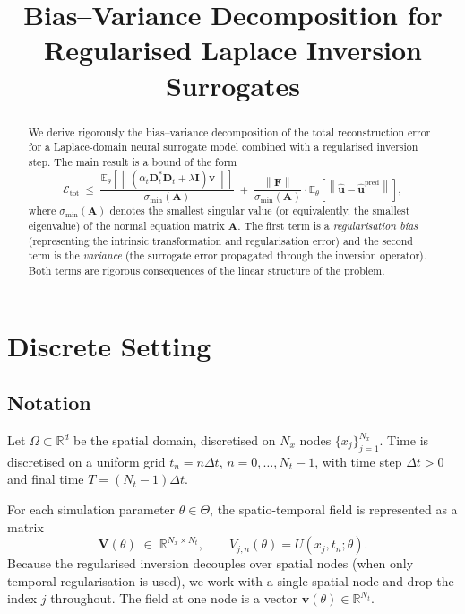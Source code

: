 \documentclass[11pt, a4paper]{article}
\title{%
  Bias--Variance Decomposition for\\
  Regularised Laplace Inversion Surrogates
}
\author{}
\date{}
\newcommand{\R}{\mathbb{R}}
\newcommand{\E}{\mathbb{E}}
\newcommand{\norm}[1]{\left\|#1\right\|}
\begin{document}
\maketitle

\begin{abstract}
We derive rigorously the bias--variance decomposition of the total reconstruction
error for a Laplace-domain neural surrogate model combined with a regularised
inversion step. The main result is a bound of the form
\[
  \mathcal{E}_{\mathrm{tot}}
  \;\leq\;
  \frac{\E_\theta\!\left[\norm{(\alpha_t \mathbf{D}_t^*\mathbf{D}_t + \lambda\mathbf{I})\mathbf{v}}\right]}
       {\sigma_{\min}(\mathbf{A})}
  \;+\;
  \frac{\norm{\mathbf{F}}}{\sigma_{\min}(\mathbf{A})}
  \cdot
  \E_\theta\!\left[\norm{\hat{\mathbf{u}} - \hat{\mathbf{u}}^{\mathrm{pred}}}\right],
\]
where $\sigma_{\min}(\mathbf{A})$ denotes the smallest singular value (or equivalently, the smallest eigenvalue) of the normal equation matrix $\mathbf{A}$. The first term is a \emph{regularisation bias} (representing the intrinsic transformation and regularisation error) and the second term is
the \emph{variance} (the surrogate error propagated through the inversion operator).
Both terms are rigorous consequences of the linear structure of the problem.
\end{abstract}

\tableofcontents
\newpage

\section{Discrete Setting}

\subsection{Notation}

Let $\Omega \subset \R^d$ be the spatial domain, discretised on $N_x$ nodes
$\{x_j\}_{j=1}^{N_x}$.
Time is discretised on a uniform grid $t_n = n\Delta t$, $n = 0,\ldots,N_t-1$,
with time step $\Delta t > 0$ and final time $T = (N_t-1)\Delta t$.

For each simulation parameter $\theta \in \Theta$, the spatio-temporal field
is represented as a matrix
\[
  \mathbf{V}(\theta) \;\in\; \R^{N_x \times N_t},
  \qquad
  V_{j,n}(\theta) = U(x_j, t_n;\theta).
\]
Because the regularised inversion decouples over spatial nodes
(when only temporal regularisation is used), we work with a single
spatial node and drop the index $j$ throughout.
The field at one node is a vector $\mathbf{v}(\theta) \in \R^{N_t}$.
\end{document}
